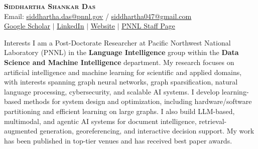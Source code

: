 \documentclass{resume} %
\begin{document}
\vspace{-0.5in}
\begin{center}
    \textbf{\Huge \scshape Siddhartha Shankar Das} \\
    \vspace{1pt}
    Email: \href{mailto:siddhartha.das@pnnl.gov}{\underline{siddhartha.das@pnnl.gov}} /
    \href{mailto:siddhartha047@gmail.com}{\underline{siddhartha047@gmail.com}} \\
    \vspace{1pt}
    \href{https://scholar.google.com/citations?user=kTAFl2yYe6QC\&hl=en}{\underline{Google Scholar}} $|$
    \href{https://www.linkedin.com/in/siddhartha-shankar-das-25993b110/}{\underline{LinkedIn}} 
    $|$
    \href{https://sites.google.com/site/siddhartha047/}{\underline{Website}} 
    $|$
    \href{https://www.pnnl.gov/people/siddhartha-shankar-das}{\underline{PNNL Staff Page}}
\end{center}

\begin{rSection}{Interests}
I am a Post-Doctorate Researcher at Pacific Northwest National Laboratory (PNNL) in the \textbf{Language Intelligence} group within the \textbf{Data Science and Machine Intelligence} department. My research focuses on artificial intelligence and machine learning for scientific and applied domains, with interests spanning graph neural networks, graph sparsification, natural language processing, cybersecurity, and scalable AI systems. I develop learning-based methods for system design and optimization, including hardware/software partitioning and efficient learning on large graphs. I also build LLM-based, multimodal, and agentic AI systems for document intelligence, retrieval-augmented generation, georeferencing, and interactive decision support. My work has been published in top-tier venues and has received best paper awards.
\end{rSection}
\end{document}
